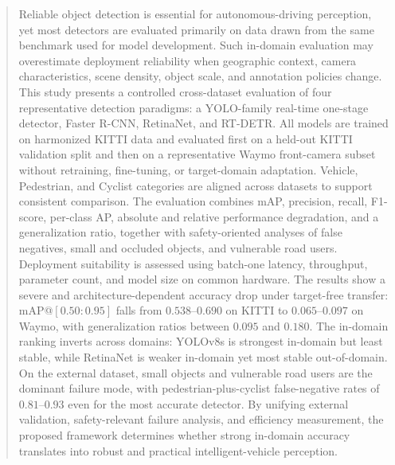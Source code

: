 \begin{abstract}
Reliable object detection is essential for autonomous-driving perception, yet most
detectors are evaluated primarily on data drawn from the same benchmark used for model
development. Such in-domain evaluation may overestimate deployment reliability when
geographic context, camera characteristics, scene density, object scale, and annotation
policies change. This study presents a controlled cross-dataset evaluation of four
representative detection paradigms: a YOLO-family real-time one-stage detector, Faster
R-CNN, RetinaNet, and RT-DETR. All models are trained on harmonized KITTI data and
evaluated first on a held-out KITTI validation split and then on a representative Waymo
front-camera subset without retraining, fine-tuning, or target-domain adaptation. Vehicle,
Pedestrian, and Cyclist categories are aligned across datasets to support consistent
comparison. The evaluation combines mAP, precision, recall, F1-score, per-class AP,
absolute and relative performance degradation, and a generalization ratio, together with
safety-oriented analyses of false negatives, small and occluded objects, and vulnerable
road users. Deployment suitability is assessed using batch-one latency, throughput,
parameter count, and model size on common hardware. The results show a severe and
architecture-dependent accuracy drop under target-free transfer: mAP@$[0.50{:}0.95]$
falls from $0.538$--$0.690$ on KITTI to $0.065$--$0.097$ on Waymo, with generalization
ratios between $0.095$ and $0.180$. The in-domain ranking inverts across domains:
YOLOv8s is strongest in-domain but least stable, while RetinaNet is weaker in-domain yet
most stable out-of-domain. On the external dataset, small objects and vulnerable road
users are the dominant failure mode, with pedestrian-plus-cyclist false-negative rates of
$0.81$--$0.93$ even for the most accurate detector. By unifying external validation,
safety-relevant failure analysis, and efficiency measurement, the proposed framework
determines whether strong in-domain accuracy translates into robust and practical
intelligent-vehicle perception.
\end{abstract}

